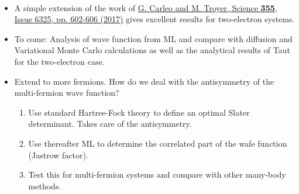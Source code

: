 \documentclass[%
oneside,                 %
final,                   %
10pt]{article}
\begin{document}
\paragraph{}
\begin{itemize}
\item A simple extension of the work of \href{{http://science.sciencemag.org/content/355/6325/602}}{G. Carleo and M. Troyer, Science \textbf{355}, Issue 6325, pp. 602-606 (2017)} gives excellent results for two-electron systems.

\item To come: Analysis of wave function from ML and compare with diffusion and Variational Monte Carlo calculations as well as the analytical results of Taut for the two-electron case.

\item Extend to more fermions. How do we deal with the antisymmetry of the multi-fermion wave function?
\begin{enumerate}

 \item Use standard Hartree-Fock theory to define an optimal Slater determinant. Takes care of the antisymmetry.

 \item Use thereafter ML to determine the correlated part of the wafe function (Jastrow factor).

 \item Test this for multi-fermion systems and compare with other many-body methods.
\end{enumerate}

\noindent
\end{itemize}

\noindent






\end{document}
